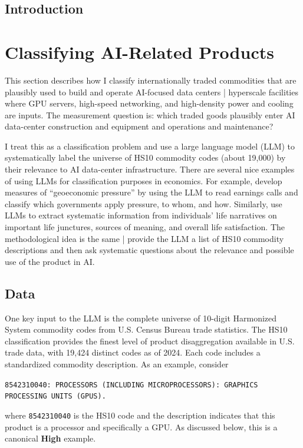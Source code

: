 \documentclass[12pt,pdftex]{article}
\newenvironment{prompt}{\par\medskip\noindent}{\par\medskip}
\begin{document}
\begin{onehalfspacing}
\hspace{-0.05cm}

\newpage

\subsection*{Introduction}



\section{Classifying AI-Related Products}\label{sec:measurment}

This section describes how I classify internationally traded commodities that are plausibly used to build and operate AI-focused data centers | hyperscale facilities where GPU servers, high-speed networking, and high-density power and cooling are inputs. The measurement question is: which traded goods plausibly enter AI data-center construction and equipment and operations and maintenance?

I treat this as a classification problem and use a large language model (LLM) to systematically label the universe of HS10 commodity codes (about 19,000) by their relevance to AI data-center infrastructure. There are several nice examples of using LLMs for classification purposes in economics. For example, \citet{clayton2025geoeconomic} develop measures of ``geoeconomic pressure'' by using the LLM to read earnings calls and classify which governments apply pressure, to whom, and how. Similarly, \citet{lagakos2025american} use LLMs to extract systematic information from individuals' life narratives on important life junctures, sources of meaning, and overall life satisfaction. The methodological idea is the same | provide the LLM a list of HS10 commodity descriptions and then ask systematic questions about the relevance and possible use of the product in AI.

\subsection{Data}

One key input to the LLM is the complete universe of 10-digit Harmonized System commodity codes from U.S. Census Bureau trade statistics. The HS10 classification provides the finest level of product disaggregation available in U.S. trade data, with 19,424 distinct codes as of 2024. Each code includes a standardized commodity description. As an example, consider
\begin{prompt}
\noindent\texttt{8542310040: PROCESSORS (INCLUDING MICROPROCESSORS): GRAPHICS PROCESSING UNITS (GPUS).}
\end{prompt}
where \texttt{8542310040} is the HS10 code and the description indicates that this product is a processor and specifically a GPU. As discussed below, this is a canonical \textbf{High} example.


\end{onehalfspacing}
\end{document}
